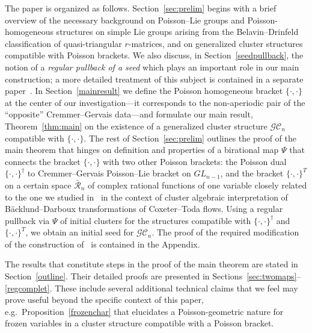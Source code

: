 \documentclass{amsart}
\theoremstyle{definition}
\theoremstyle{remark}
\numberwithin{equation}{section}
\numberwithin{theorem}{section}
\def\CC{{\mathcal C}}
\def\G{{\mathcal G}}
\def\RR{{\mathcal R}}
\def\Poi{{\{{\cdot},{\cdot}\}}}
\begin{document}
The paper is organized as follows. Section~\ref{sec:prelim} begins with a brief overview of the necessary background on Poisson--Lie groups and Poisson-homogeneous structures on simple Lie groups arising from the 
Belavin--Drinfeld classification of quasi-triangular $r$-matrices, and on generalized cluster structures compatible with Poisson brackets. We also discuss, in Section~\ref{seedpullback},  the notion of a {\em regular pullback of a seed\/} which plays an important role in our main construction;  a more detailed treatment of this subject is contained in a separate paper~\cite{GSVpullback}. In Section~\ref{mainresult} we define the Poisson homogeneous bracket 
$\Poi$ at the center of our investigation---it corresponds to the non-aperiodic pair of the ``opposite'' Cremmer--Gervais 
data---and formulate our main result, Theorem~\ref{thm:main} on the existence of a generalized cluster structure $\G\CC_n$  compatible with $\Poi$. The rest of Section~\ref{sec:prelim} outlines the proof of the main theorem that hinges on definition and properties of a birational map $\Psi$ that connects the bracket $\Poi$ with two other Poisson brackets: the Poisson dual  $\Poi^\dag$ to Cremmer--Gervais Poisson--Lie bracket on $GL_{n-1}$, and the bracket $\Poi^T$ on a certain space $\bar\RR_n$ of complex rational functions of one variable closely related to the one we studied in~\cite{GSV_Acta} in the context of cluster algebraic interpretation of B\"acklund--Darboux transformations of Coxeter--Toda flows. Using a regular pullback via $\Psi$ of initial clusters for the structures compatible with $\Poi^\dag$ and $\Poi^T$, 
we obtain an initial seed for $\G\CC_n$. The proof of the required modification of the construction of~\cite{GSV_Acta} is contained in the Appendix.

The results that constitute steps in  the proof of the main theorem are stated in Section~\ref{outline}. Their detailed proofs are presented in Sections~\ref{sec:twomaps}--\ref{regcomplet}. These include several additional technical claims that we feel may prove useful beyond the specific context of this paper, e.g.~Proposition~\ref{frozenchar} that elucidates a Poisson-geometric nature for frozen variables in a cluster structure compatible with a Poisson bracket.
\end{document}
